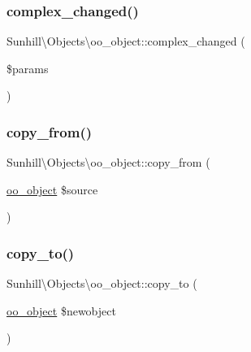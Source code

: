 \subsubsection{\texorpdfstring{complex\+\_\+changed()}{complex\_changed()}}
{\footnotesize\ttfamily Sunhill\textbackslash{}\+Objects\textbackslash{}oo\+\_\+object\+::complex\+\_\+changed (\begin{DoxyParamCaption}\item[{}]{\$params }\end{DoxyParamCaption})\hspace{0.3cm}{\ttfamily [protected]}}

\mbox{\label{classSunhill_1_1Objects_1_1oo__object_a5fd7459ede2e80a6ae5d4e31a5b072da}} 
\subsubsection{\texorpdfstring{copy\+\_\+from()}{copy\_from()}}
{\footnotesize\ttfamily Sunhill\textbackslash{}\+Objects\textbackslash{}oo\+\_\+object\+::copy\+\_\+from (\begin{DoxyParamCaption}\item[{\hyperlink{classSunhill_1_1Objects_1_1oo__object}{oo\+\_\+object}}]{\$source }\end{DoxyParamCaption})}

\mbox{\label{classSunhill_1_1Objects_1_1oo__object_ad99dbeb32a4cdcf768d89709d3ee8ff6}} 
\subsubsection{\texorpdfstring{copy\+\_\+to()}{copy\_to()}}
{\footnotesize\ttfamily Sunhill\textbackslash{}\+Objects\textbackslash{}oo\+\_\+object\+::copy\+\_\+to (\begin{DoxyParamCaption}\item[{\hyperlink{classSunhill_1_1Objects_1_1oo__object}{oo\+\_\+object}}]{\$newobject }\end{DoxyParamCaption})\hspace{0.3cm}{\ttfamily [protected]}}

